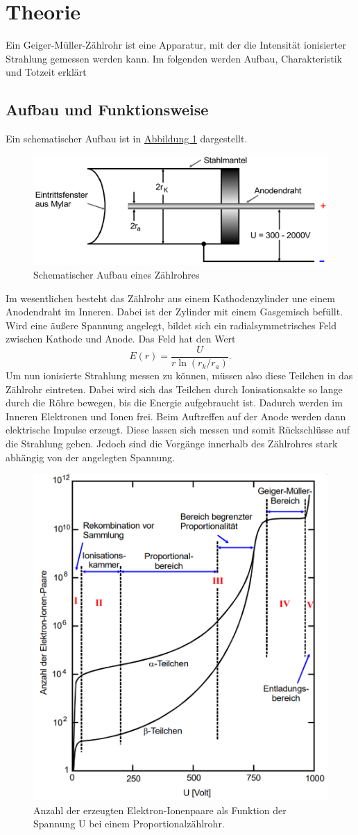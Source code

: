 \section{Theorie}
\label{sec:Theorie}


Ein Geiger-Müller-Zählrohr ist eine Apparatur, mit der die Intensität ionisierter Strahlung gemessen werden kann.
Im folgenden werden Aufbau, Charakteristik und Totzeit erklärt
\subsection{Aufbau und Funktionsweise}
Ein schematischer Aufbau ist in \hyperref[fig:Aufbau1]{Abbildung \ref{fig:Aufbau1}} dargestellt.
\begin{figure} [H]
    \center
    \caption{Schematischer Aufbau eines Zählrohres}\label{fig:Aufbau1}
    \includegraphics[width=0.7\linewidth]{pictures/Aufbau1.pdf}
\end{figure}
Im wesentlichen besteht das Zählrohr aus einem Kathodenzylinder une einem Anodendraht im Inneren.
Dabei ist der Zylinder mit einem Gasgemisch befüllt.
Wird eine äußere Spannung angelegt, bildet sich ein radialsymmetrisches Feld zwischen Kathode und Anode.
Das Feld hat den Wert
\begin{equation}
    E(r)=\frac{U}{r \ln \left(r_{k} / r_{a}\right)}.
\end{equation}
Um nun ionisierte Strahlung messen zu können, müssen also diese Teilchen in das Zählrohr eintreten.
Dabei wird sich das Teilchen durch Ionisationsakte so lange durch die Röhre bewegen, bis die Energie aufgebraucht ist.
Dadurch werden im Inneren Elektronen und Ionen frei. Beim Auftreffen auf der Anode werden dann elektrische Impulse erzeugt.
Diese lassen sich messen und somit Rückschlüsse auf die Strahlung geben.
Jedoch sind die Vorgänge innerhalb des Zählrohres stark abhängig von der angelegten Spannung.
\begin{figure}
    \center
    \includegraphics[width=0.5\linewidth]{pictures/Diagramm1.pdf}
    \caption{Anzahl der erzeugten Elektron-Ionenpaare als Funktion der Spannung U bei einem Proportionalzählrohr.}\label{fig:Diagramm1}
\end{figure}
